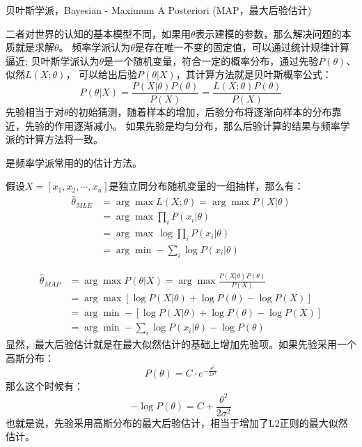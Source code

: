 贝叶斯学派，Bayesian - Maximum A Posteriori (MAP，最大后验估计)

二者对世界的认知的基本模型不同，如果用$\theta$表示建模的参数，那么解决问题的本质就是求解$\theta$。
频率学派认为$\theta$是存在唯一不变的固定值，可以通过统计规律计算逼近; 
贝叶斯学派认为$\theta$是一个随机变量，符合一定的概率分布，通过先验$P(\theta)$、似然$L(X;\theta)$，
可以给出后验$P(\theta|X)$，其计算方法就是贝叶斯概率公式：
\begin{equation*}
    P(\theta|X) = \frac{P(X|\theta)P(\theta)}{P(X)} = \frac{L(X;\theta)P(\theta)}{P(X)}
\end{equation*}
先验相当于对$\theta$的初始猜测，随着样本的增加，后验分布将逐渐向样本的分布靠近，先验的作用逐渐减小。
如果先验是均匀分布，那么后验计算的结果与频率学派的计算方法将一致。

{} 是频率学派常用的的估计方法。

假设$X=[x_1, x_2, \cdots, x_n]$是独立同分布随机变量的一组抽样，那么有：
\begin{align*}
    \hat{\theta}_{MLE} &= \arg \max L(X;\theta) = \arg \max P(X|\theta) \\
    &= \arg \max \prod_i P(x_i|\theta) \\
    &= \arg \max \, \log \prod_i P(x_i|\theta) \\
    &= \arg \min -\sum_i \log P(x_i|\theta)    
\end{align*}

{}
\begin{align*}
    \hat{\theta}_{MAP} &= \arg \max P(\theta|X) = \arg\max \frac{P(X|\theta)P(\theta)}{P(X)} \\
    &= \arg \max \left[\log P(X|\theta) + \log P(\theta) - \log P(X) \right] \\
    &= \arg \min -\left[\log P(X|\theta) + \log P(\theta) - \log P(X) \right] \\
    &= \arg \min -\sum_i \log P(x_i|\theta) -\log P(\theta)
\end{align*}
显然，最大后验估计就是在最大似然估计的基础上增加先验项。如果先验采用一个高斯分布：
\begin{equation*}
    P(\theta) = C \cdot e^{-\frac{\theta^2}{2\sigma^2}}
\end{equation*}
那么这个时候有：
\begin{equation*}
    - \log P(\theta) = C + \frac{\theta^2}{2\sigma^2}
\end{equation*}
也就是说，{\color{red}先验采用高斯分布的最大后验估计，相当于增加了L2正则的最大似然估计。}


